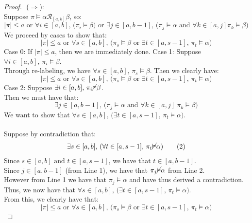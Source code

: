 \documentclass[runningheads]{llncs}
\begin{document}
\begin{proof} $ $\newline
($\Rightarrow$):\\
\indent Suppose $\pi \vDash \alpha \mathcal{R}_{[a,b]} \beta$, so:
\[ |\pi| \leq a \text{ or } \forall i \in [a,b] \text{, (} \pi_i \vDash \beta \text{) or } \exists j \in [a,b-1] \text{, (} \pi_j \vDash \alpha \text{ and } \forall k \in [a, j] \pi_k \vDash \beta \text{)} \]
We proceed by cases to show that:
\[
|\pi| \le a \text{ or } \forall s \in [a,b] \text{, (} \pi_s \vDash \beta \text{ or } \exists t \in [a, s-1] \text{, } \pi_t \vDash \alpha \text{)} \tag{A1}
\]
\indent Case 0: If $|\pi| \leq a$, then we are immediately done.
\indent Case 1: Suppose $\forall i \in [a,b] \text{, } \pi_i \vDash \beta$.\\
\indent Through re-labeling, we have $\forall s \in [a,b] \text{, } \pi_s \vDash \beta$. Then we clearly have:
\[
|\pi| \le a \text{ or } \forall s \in [a,b] \text{, (} \pi_s \vDash \beta \text{ or } \exists t \in [a, s-1] \text{, } \pi_t \vDash \alpha \text{)} \tag{A1}
\]
\indent Case 2: Suppose $\exists i \in [a,b] \text{, } \pi_i \cancel{\vDash} \beta$.\\
\indent \indent Then we must have that:
\[ \exists j \in [a,b-1] \text{, (} \pi_j \vDash \alpha \text{ and } \forall k \in [a, j] \ \pi_k \vDash \beta \text{)} \tag{1} \]
\indent \indent We want to show that $ \forall s \in [a,b] \text{, (} \exists t \in [a, s-1] \text{, } \pi_t \vDash \alpha \text{)}$.\\
\\
\indent \indent Suppose by contradiction that: 
\[ \exists s \in [a,b] \text{, (} \forall t \in [a, s-1] \text{, } \pi_t \cancel{\vDash} \alpha \text{)} \tag{2} \]
\indent \indent Since $s \in [a,b] \text{ and }  t \in [a, s-1]$, we have that $t \in [a,b-1]$.\\
\indent \indent Since $j \in [a,b-1]$ (from Line 1), we have that $\pi_j \cancel{\vDash} \alpha$ from Line 2.\\
\indent \indent However from Line 1 we have that $\pi_j \vDash \alpha$ and have thus derived a contradiction.\\
\indent \indent Thus, we now have that $ \forall s \in [a,b] \text{, (} \exists t \in [a, s-1] \text{, } \pi_t \vDash \alpha \text{)}$.\\ \indent \indent From this, we clearly have that:
\[
|\pi| \le a \text{ or } \forall s \in [a,b] \text{, (} \pi_s \vDash \beta \text{ or } \exists t \in [a, s-1] \text{, } \pi_t \vDash \alpha \text{)} \tag{A1}
\]
\end{proof}
\end{document}

